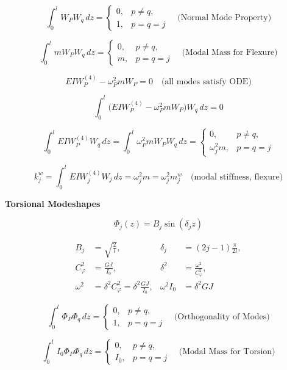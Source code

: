 \documentclass[11pt]{article}
\begin{document}
\[
\int_{0}^{l}{W_{P}W_{q}\,dz} =
\begin{cases}
0, & p \neq q,\\[4pt]
1, & p = q = j
\end{cases}
\quad \text{(Normal Mode Property)}
\]

\[
\int_{0}^{l}{mW_{P}W_{q}\,dz} =
\begin{cases}
0, & p \neq q,\\[4pt]
m, & p = q = j
\end{cases}
\quad \text{(Modal Mass for Flexure)}
\]

\[
EIW_{P}^{(4)} - \omega_{P}^{2}mW_{P} = 0
\quad \text{(all modes satisfy ODE)}
\]

\[
\int_{0}^{l}{\Big( EIW_{P}^{(4)} - \omega_{P}^{2}mW_{P} \Big)W_{q}\,dz} = 0
\]

\[
\int_{0}^{l}{EIW_{P}^{(4)}W_{q}\,dz}
=
\int_{0}^{l}{\omega_{P}^{2}mW_{P}W_{q}\,dz}
=
\begin{cases}
0, & p \neq q,\\[4pt]
\omega_{j}^{2}m, & p = q = j
\end{cases}
\]

\[
k_{j}^{w} =
\int_{0}^{l}{EIW_{j}^{(4)}W_{j}\,dz}
= \omega_{j}^{2}m
= \omega_{j}^{2}m_{j}^{w}
\quad \text{(modal stiffness, flexure)}
\]

\textbf{Torsional Modeshapes}

\[
\Phi_{j}(z) = B_{j}\sin(\delta_{j}z)
\]

\[
\begin{aligned}
B_{j} &= \sqrt{\frac{2}{l}}, &
\delta_{j} &= (2j - 1)\frac{\pi}{2l}, \\
C_{\varphi}^{2} &= \frac{GJ}{I_{0}}, &
\delta^{2} &= \frac{\omega^{2}}{C_{\varphi}^{2}}, \\
\omega^{2} &= \delta^{2}C_{\varphi}^{2}
           = \delta^{2}\frac{GJ}{I_{0}}, &
\omega^{2} I_{0} &= \delta^{2}GJ
\end{aligned}
\]

\[
\int_{0}^{l}{\Phi_{P}\Phi_{q}\,dz} =
\begin{cases}
0, & p \neq q,\\[4pt]
1, & p = q = j
\end{cases}
\quad \text{(Orthogonality of Modes)}
\]

\[
\int_{0}^{l}{I_{0}\Phi_{P}\Phi_{q}\,dz} =
\begin{cases}
0, & p \neq q,\\[4pt]
I_{0}, & p = q = j
\end{cases}
\quad \text{(Modal Mass for Torsion)}
\]
\end{document}
